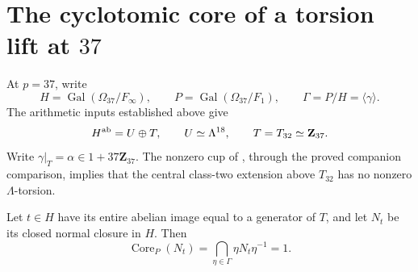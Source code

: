 \section{The cyclotomic core of a torsion lift at \(37\)}
\label{sec:p37-core}

At \(p=37\), write
\[
 H=\operatorname{Gal}(\Omega_{37}/F_\infty),\qquad
 P=\operatorname{Gal}(\Omega_{37}/F_1),\qquad
 \Gamma=P/H=\langle\gamma\rangle.
\]
The arithmetic inputs established above give
\[
 H^{\rm ab}=U\oplus T,\qquad U\simeq\Lambda^{18},
 \qquad T=T_{32}\simeq\mathbf Z_{37}.
\]
Write \(\gamma|_T=\alpha\in1+37\mathbf Z_{37}\).
The nonzero cup of \cite[Theorem~7.5, p.~20; Corollary~8.3, p.~23]{MS}, through the proved
companion comparison, implies that the central class-two
extension above \(T_{32}\) has no nonzero \(\Lambda\)-torsion.

\begin{theorem}\label{thm:p37-cyclotomic-core}
Let \(t\in H\) have its entire abelian image equal to a generator
of \(T\), and let \(N_t\) be its closed normal closure in \(H\).
Then
\[
 \operatorname{Core}_{P}(N_t)
   =\bigcap_{\eta\in\Gamma}\eta N_t\eta^{-1}=1.
\]
\end{theorem}

